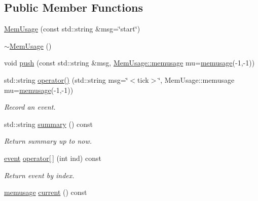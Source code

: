 \subsection*{Public Member Functions}
\begin{DoxyCompactItemize}
\item 
\hyperlink{class_wire_cell_1_1_mem_usage_a0310c0e9d34fb5b037f95cc147c21d08}{Mem\+Usage} (const std\+::string \&msg=\char`\"{}start\char`\"{})
\item 
\hyperlink{class_wire_cell_1_1_mem_usage_ad49a857aebe91c9c8bb1c3cb549807ac}{$\sim$\+Mem\+Usage} ()
\item 
void \hyperlink{class_wire_cell_1_1_mem_usage_af58b3442b7ec01350398c8977541d06c}{push} (const std\+::string \&msg, \hyperlink{class_wire_cell_1_1_mem_usage_ab022bc829c4166d0161f3c91195f062f}{Mem\+Usage\+::memusage} mu=\hyperlink{class_wire_cell_1_1_mem_usage_ab022bc829c4166d0161f3c91195f062f}{memusage}(-\/1,-\/1))
\item 
std\+::string \hyperlink{class_wire_cell_1_1_mem_usage_a3ab27a762267e6401a3e10f1487c34d3}{operator()} (std\+::string msg=\char`\"{}$<$tick$>$\char`\"{}, Mem\+Usage\+::memusage mu=\hyperlink{class_wire_cell_1_1_mem_usage_ab022bc829c4166d0161f3c91195f062f}{memusage}(-\/1,-\/1))
\begin{DoxyCompactList}\small\item\em Record an event. \end{DoxyCompactList}\item 
std\+::string \hyperlink{class_wire_cell_1_1_mem_usage_acdcd1e9ea7c3e3bcb261be506eae47e9}{summary} () const
\begin{DoxyCompactList}\small\item\em Return summary up to now. \end{DoxyCompactList}\item 
\hyperlink{class_wire_cell_1_1_mem_usage_ac40a9ad5d6984d90924a179ca77aab3b}{event} \hyperlink{class_wire_cell_1_1_mem_usage_a136b6c458ca2cae89527fbceb33ea2c4}{operator\mbox{[}$\,$\mbox{]}} (int ind) const
\begin{DoxyCompactList}\small\item\em Return event by index. \end{DoxyCompactList}\item 
\hyperlink{class_wire_cell_1_1_mem_usage_ab022bc829c4166d0161f3c91195f062f}{memusage} \hyperlink{class_wire_cell_1_1_mem_usage_a0413f9a3a49204c96d5462dbb3922b44}{current} () const
\end{DoxyCompactItemize}


